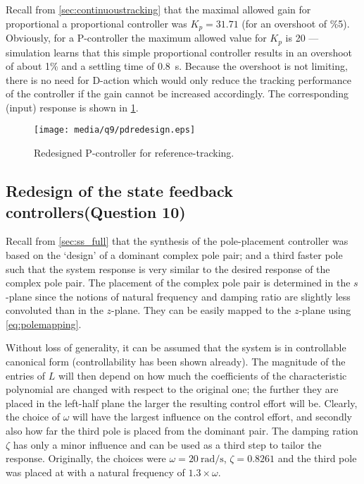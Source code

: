 Recall from \cref{sec:continuoustracking} that the maximal allowed gain for proportional a proportional controller was $K_p = 31.71$ (for an overshoot of \%5). Obviously, for a P-controller the maximum allowed value for $K_p$ is 20 --- simulation learns that this simple proportional controller results in an overshoot of about 1\% and a settling time of \SI{0.8}{\second}. Because the overshoot is not limiting, there is no need for D-action which would only reduce the tracking performance of the controller if the gain cannot be increased accordingly. The corresponding (input) response is shown in \cref{fig:q9_pdredesign}.
\begin{figure}[ht]
    \centering
    \texttt{[image: media/q9/pdredesign.eps]}
    \caption{Redesigned P-controller for reference-tracking.}
    \label{fig:q9_pdredesign}
\end{figure}


\subsection{Redesign of the state feedback controllers\textnormal{\phantom{xxx}(Question 10)}}
\label{sec:retunepolep}
Recall from \cref{sec:ss_full} that the synthesis of the pole-placement controller was based on the `design' of a dominant complex pole pair; and a third faster pole such that the system response is very similar to the desired response of the complex pole pair. The placement of the complex pole pair is determined in the $s$-plane since the notions of natural frequency and damping ratio are slightly less convoluted than in the $z$-plane. They can be easily mapped to the $z$-plane using \cref{eq:polemapping}.

Without loss of generality, it can be assumed that the system is in controllable canonical form (controllability has been shown already). The magnitude of the entries of $L$ will then depend on how much the coefficients of the characteristic polynomial are changed with respect to the original one; the further they are placed in the left-half plane the larger the resulting control effort will be. Clearly, the choice of $\omega$ will have the largest influence on the control effort, and secondly also how far the third pole is placed from the dominant pair. The damping ration $\zeta$ has only a minor influence and can be used as a third step to tailor the response. Originally, the choices were $\omega = \SI{20}{\radian\per\second}$, $\zeta = 0.8261$ and the third pole was placed at with a natural frequency of $1.3\times\omega$.

